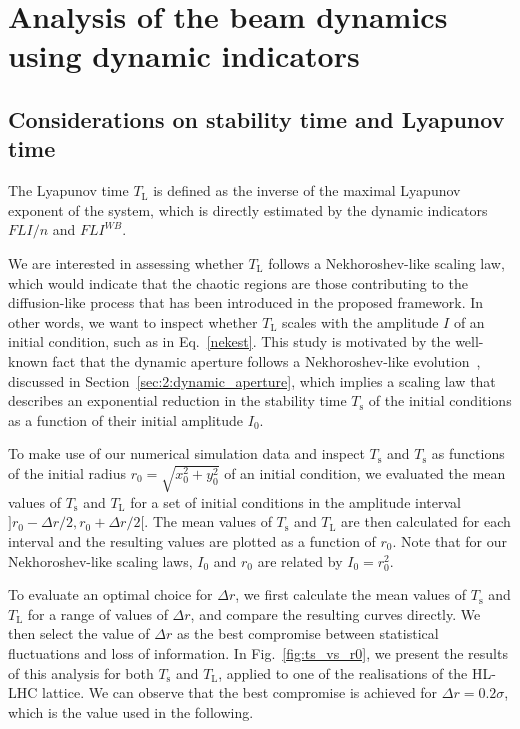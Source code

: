 \section{Analysis of the beam dynamics using dynamic indicators}\label{sec:8:detailed}

\subsection{Considerations on stability time and Lyapunov time}

The Lyapunov time $T_\mathrm{L}$ is defined as the inverse of the maximal Lyapunov exponent of the system, which is directly estimated by the dynamic indicators $FLI/n$ and $FLI^{{WB}}$.

We are interested in assessing whether $T_\mathrm{L}$ follows a Nekhoroshev-like scaling law, which would indicate that the chaotic regions are those contributing to the diffusion-like process that has been introduced in the proposed framework. In other words, we want to inspect whether $T_\mathrm{L}$ scales with the amplitude $I$ of an initial condition, such as in Eq.~\eqref{nekest}. This study is motivated by the well-known fact that the dynamic aperture follows a Nekhoroshev-like evolution~\cite{Bazzani:2019csk}, discussed in Section~\ref{sec:2:dynamic_aperture}, which implies a scaling law that describes an exponential reduction in the stability time $T_\mathrm{s}$ of the initial conditions as a function of their initial amplitude $I_0$.

To make use of our numerical simulation data and inspect $T_\mathrm{s}$ and $T_\mathrm{s}$ as functions of the initial radius $r_0 = \sqrt{x_0^2 + y_0^2}$ of an initial condition, we evaluated the mean values of $T_\mathrm{s}$ and $T_\mathrm{L}$ for a set of initial conditions in the amplitude interval $]r_0-\Delta r/2, r_0 +\Delta r/2[$. The mean values of $T_\mathrm{s}$ and $T_\mathrm{L}$ are then calculated for each interval and the resulting values are plotted as a function of $r_0$. Note that for our Nekhoroshev-like scaling laws, $I_0$ and $r_0$ are related by $I_0 = r_0^2$.

To evaluate an optimal choice for $\Delta r$, we first calculate the mean values of $T_\mathrm{s}$ and $T_\mathrm{L}$ for a range of values of $\Delta r$, and compare the resulting curves directly. We then select the value of $\Delta r$ as the best compromise between statistical fluctuations and loss of information. In Fig.~\ref{fig:ts_vs_r0}, we present the results of this analysis for both $T_\mathrm{s}$ and $T_\mathrm{L}$, applied to one of the realisations of the HL-LHC lattice. We can observe that the best compromise is achieved for $\Delta r = 0.2\sigma$, which is the value used in the following.

